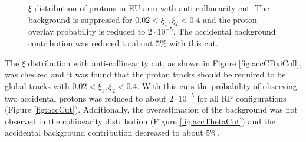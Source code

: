 \begin{enumerate}
\begin{figure}[H]
{\begin{subfigure}[b]{\linewidth}{
				}
		\end{subfigure}
	}
	\parbox{0.48\textwidth}{
		\centering
		\begin{subfigure}[b]{\linewidth}{
				}
		\end{subfigure}
	}
	\caption[$\xi$ distribution of protons in EU arm with anti-collinearity cut]{$\xi$ distribution of protons in EU arm with anti-collinearity cut. The background is suppressed for  $0.02<\xi_1,\xi_2<0.4$ and the proton overlay probability is reduced to $2\cdot10^{-5}$. The accidental background contribution was reduced to about $5\%$ with this cut.}
\end{figure}
	The $\xi$ distribution  with anti-collinearity cut, as shown in Figure \ref{fig:accCDxiColl}, was checked and it was found that the proton tracks should be required to be global tracks with $0.02<\xi_1,\xi_2<0.4$. With this cuts the probability of observing two accidental protons was reduced to about $2\cdot10^{-5}$ for all RP configurations (Figure \ref{fig:accCut}). Additionally, the overestimation of the background was not observed in the collinearity distribution (Figure \ref{fig:accThetaCut}) and the accidental background contribution decreased to about $5\%$.
\begin{figure}[H]
	\centering
	\parbox{0.48\textwidth}{
		\centering
}
\end{figure}
\end{enumerate}
